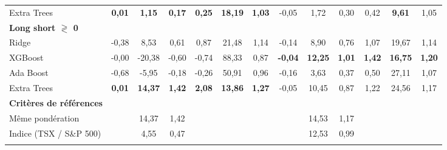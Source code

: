 \begin{table}[h]
{\begin{tabular}{l *{6}{S[table-format=3.2]} | *{6}{S[table-format=3.2]}}
Extra Trees & \bfseries\color{Green}0,01 & \bfseries\color{Green}1,15 & \bfseries\color{Green}0,17 & \bfseries\color{Green}0,25 & \bfseries\color{Green}18,19 & \bfseries\color{Green}1,03 & -0,05 & 1,72 & 0,30 & 0,42 & \bfseries\color{Green}9,61 & 1,05 \\ \addlinespace[0.1cm]
\textbf{Long short $\gtrless$ 0} &  &  &  &  &  &  &  &  &  &  &  & \\
\addlinespace[0.1cm]
Ridge & -0,38 & 8,53 & 0,61 & 0,87 & 21,48 & 1,14 & -0,14 & 8,90 & 0,76 & 1,07 & 19,67 & 1,14 \\ \addlinespace[0.1cm]
XGBoost & -0,00 & -20,38 & -0,60 & -0,74 & 88,33 & 0,87 & \bfseries\color{Green}-0,04 & \bfseries\color{Green}12,25 & \bfseries\color{Green}1,01 & \bfseries\color{Green}1,42 & \bfseries\color{Green}16,75 & \bfseries\color{Green}1,20 \\ \addlinespace[0.1cm]
Ada Boost & -0,68 & -5,95 & -0,18 & -0,26 & 50,91 & 0,96 & -0,16 & 3,63 & 0,37 & 0,50 & 27,11 & 1,07 \\ \addlinespace[0.1cm]
Extra Trees & \bfseries\color{Green}0,01 & \bfseries\color{Green}14,37 & \bfseries\color{Green}1,42 & \bfseries\color{Green}2,08 & \bfseries\color{Green}13,86 & \bfseries\color{Green}1,27 & -0,05 & 10,45 & 0,87 & 1,22 & 24,56 & 1,17 \\ \addlinespace[0.1cm]
\textbf{Critères de références} &  &  &  &  &  &  &  &  &  &  &  & \\
\addlinespace[0.1cm]
Même pondération &  & 14,37 & 1,42 &  &  &  &  & 14,53 & 1,17 &  &  &  \\ \addlinespace[0.1cm]
Indice (TSX / S\&P 500) &  & 4,55 & 0,47 &  &  &  &  & 12,53 & 0,99 &  &  &  \\ \addlinespace[0.1cm]
\bottomrule
\end{tabular}}
\end{table}
